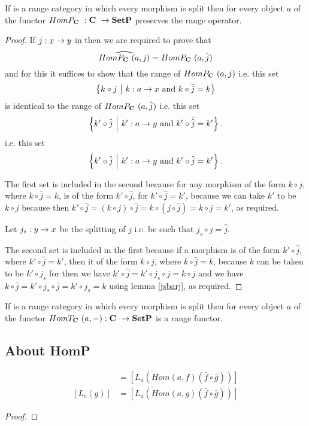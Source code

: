 \begin{lemma}
If \catcw is a range category in which every morphism is split then
for every object $a$ of \catcw the functor $HomP_{\textbf{C}}\ : \textbf{C}\  \rightarrow \textbf{SetP}$ preserves the range operator.
\end{lemma}
\begin{proof}
If $j: x \rightarrow y$ in \catcw then we are required to prove that
$$\widehat{HomP_{\textbf{C}}\ (a,j)}=HomP_{\textbf{C}}\ (a,\hat{j})$$
and for this it suffices to show that the range of $HomP_{\textbf{C}}\ (a,j)$ 
i.e. this set
$$\left\{ k \circ j \ \middle|\ k: a \rightarrow x \mbox{ and } k \circ \bar{j} = k \right\}$$ 
is identical to the range of $HomP_{\textbf{C}}\ (a,\hat{j})$ 
i.e. this set
$$\left\{k' \circ \hat{j} \ \middle|\ k':a \rightarrow y \mbox{ and } k' \circ \bar{\hat{j}} = k' \right\}.$$   
i.e. this set
$$\left\{k' \circ \hat{j} \ \middle|\ k':a \rightarrow y \mbox{ and } k' \circ \hat{j} = k' \right\}.$$

The first set is included in the second because for any morphism of the form $k \circ j$, 
where $k \circ \bar{j}=k$, 
is of the form $k' \circ \hat{j}$, for $k' \circ \hat{j} = k'$, 
because we can take $k'$ to be $k \circ j$ 
because then 
$k' \circ \hat{j} = (k \circ j) \circ \hat{j}= k \circ(j \circ \hat{j})= k \circ j = k'$,
as required. 

Let $j_s : y \rightarrow x$ be the splitting of $j$ i.e. be such that $j_s \circ j = \hat{j}$.

The second set is included in the first because if a morphism is of the form $k' \circ \hat{j}$, where $k' \circ \hat{j} = k'$, then it of the form $k \circ j$, where $k \circ \bar{j}=k$, because $k$ can be taken to be $k' \circ j_s$ for then we have 
$k' \circ \hat{j} = k' \circ j_s \circ j = k \circ j$
and we have $k \circ \bar{j}= k' \circ j_s \circ \bar{j} =  k' \circ j_s = k$ using lemma
\ref{jsbarj}, as required. 
 \end{proof}

\begin{corollary}
If \catcw is a range category in which every morphism is split then
for every object $a$ of \catcw the functor $HomT_{\textbf{C}}\ (a,-): \textbf{C}\  \rightarrow \textbf{SetP}$ is a range functor.
\end{corollary}

\subsection{About HomP}
\begin{lemma}
\label{HomOfEffbargbar}
\fgsourcediag
\begin{align*}
[L_c(f)] &= [L_a(Hom(a,f)(\bar{f}\circ\bar{g}))] \\
[L_c(g)] &= [L_a(Hom(a,g)(\bar{f}\circ\bar{g}))]
\end{align*} 
\end{lemma}
\begin{proof}
\end{proof}
